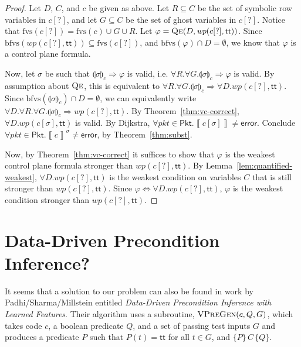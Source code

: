 \documentclass{article}
\newcommand{\pkt}{\mathit{pkt}}
\newcommand{\error}{\mathsf{error}}
\newcommand{\denote}[1]{\left\llbracket#1\right\rrbracket}
\newcommand{\TRUE}{\mathsf{tt}}
\newcommand{\Pkt}{\mathsf{Pkt}}
\newcommand{\WP}{\textit{wp}}
\newcommand{\state}[1]{\llparenthesis#1\rrparenthesis}
\newcommand{\instr}{[?]}
\newcommand{\qe}{\textsc{Qe}}
\newcommand{\fvs}{\textrm{fvs}}
\newcommand{\bfvs}{\textrm{bfvs}}
\theoremstyle{plain}
\theoremstyle{definition}
\theoremstyle{remark}
\begin{document}
\begin{proof}
  Let $D$, $C$, and $c$ be given as above. Let $R \subseteq C$ be the set of
  symbolic row variables in $c\instr$, and let $G \subseteq C$ be the set of
  ghost variables in $c\instr$. Notice that $\fvs(c\instr) = \fvs(c) \cup G \cup
  R$. Let $\varphi = \qe(D,\WP(c\instr, \TRUE))$. Since
  $\bfvs(\WP(c\instr,\TRUE)) \subseteq \fvs(c\instr)$, and $\bfvs(\varphi) \cap
  D = \emptyset$, we know that $\varphi$ is a control plane formula.

  Now, let $\sigma$ be such that $\state\sigma_c \Rightarrow \varphi$ is valid,
  i.e. $\forall R. \forall G. \state\sigma_c \Rightarrow \varphi$ is valid. By
  assumption about $\qe$, this is equivalent to $\forall R.\forall G.
  \state\sigma_c \Rightarrow \forall D. \WP(c\instr, \TRUE)$. Since
  $\bfvs(\state\sigma_c) \cap D = \emptyset$, we can equivalently write $\forall
  D. \forall R. \forall G. \state\sigma_c \Rightarrow \WP(c\instr,\TRUE)$. By
  Theorem~\ref{thm:vc-correct}, $\forall D. \WP(c[\sigma],\TRUE)$ is valid. By Dijkstra,
  $\forall \pkt \in \Pkt. \denote{c[\sigma]} \neq \error$. Conclude $\forall
  \pkt \in \Pkt. \denote{c}^\sigma \neq \error$, by Theorem~\ref{thm:subst}.

  Now, by Theorem~\ref{thm:vc-correct} it suffices to show that $\varphi$ is the
  weakest control plane formula stronger than $\WP(c[?], \TRUE)$. By
  Lemma~\ref{lem:quantified-weakest}, $\forall D. \WP(c\instr, \TRUE)$ is the
  weakest condition on variables $C$ that is still stronger than
  $\WP(c\instr,\TRUE)$. Since $\varphi \Leftrightarrow \forall D. \WP(c\instr,
  \TRUE)$, $\varphi$ is the weakest condition stronger than $\WP(c\instr,\TRUE)$.

\end{proof}





\clearpage
\section{Data-Driven Precondition Inference?}


It seems that a solution to our problem can also be found in work by
Padhi/Sharma/Millstein entitled \textit{Data-Driven Precondition Inference with
  Learned Features}. Their algorithm uses a subroutine,
$\textsc{VPreGen}(c,Q,G)$, which takes code $c$, a boolean predicate $Q$,
and a set of passing test inputs $G$ and produces a predicate $P$ such that
$P(t) = \TRUE$ for all $t \in G$, and $\{P\}\,C\,\{Q\}$.
\end{document}
